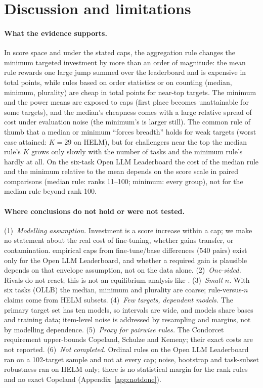 \section{Discussion and limitations}
\label{sec:limits}
\paragraph{What the evidence supports.} In score space and under the stated caps, the aggregation rule changes the minimum targeted investment by more than an order of magnitude: the mean rule rewards one large jump summed over the leaderboard and is expensive in total points, while rules based on order statistics or on counting (median, minimum, plurality) are cheap in total points for near-top targets. The minimum and the power means are exposed to caps (first place becomes unattainable for some targets), and the median's cheapness comes with a large relative spread of cost under evaluation noise (the minimum's is larger still). The common rule of thumb that a median or minimum ``forces breadth'' holds for weak targets (worst case attained: $K=29$ on HELM), but for challengers near the top the median rule's $K$ grows only slowly with the number of tasks and the minimum rule's hardly at all. On the six-task Open LLM Leaderboard the cost of the median rule and the minimum relative to the mean depends on the score scale in paired comparisons (median rule: ranks 11--100; minimum: every group), not for the median rule beyond rank 100.

\paragraph{Where conclusions do not hold or were not tested.}
(1)~\emph{Modelling assumption.} Investment is a score increase within a cap; we make no statement about the real cost of fine-tuning, whether gains transfer, or contamination. empirical caps from fine-tune/base differences (540 pairs) exist only for the Open LLM Leaderboard, and whether a required gain is plausible depends on that envelope assumption, not on the data alone.
(2)~\emph{One-sided.} Rivals do not react; this is not an equilibrium analysis like \citet{chen2026incentives}.
(3)~\emph{Small $n$.} With six tasks (OLLB) the median, minimum and plurality are coarse; rule-versus-$n$ claims come from HELM subsets.
(4)~\emph{Few targets, dependent models.} The primary target set has ten models, so intervals are wide, and models share bases and training data; item-level noise is addressed by resampling and margins, not by modelling dependence.
(5)~\emph{Proxy for pairwise rules.} The Condorcet requirement upper-bounds Copeland, Schulze and Kemeny; their exact costs are not reported.
(6)~\emph{Not completed.} Ordinal rules on the Open LLM Leaderboard ran on a 102-target sample and not at every cap; noise, bootstrap and task-subset robustness ran on HELM only; there is no statistical margin for the rank rules and no exact Copeland (Appendix~\ref{app:notdone}).
